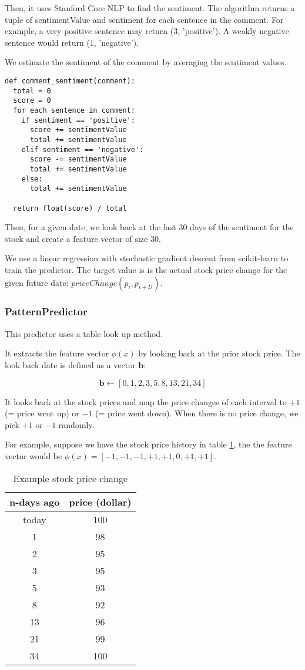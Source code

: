\documentclass[twocolumn,10pt]{asme2ej}
\newcommand{\vect}[1]{\boldsymbol{#1}}
\begin{document}
Then, it uses Stanford Core NLP \cite{manning-EtAl:2014:P14-5} to find
the sentiment. The algorithm returns a tuple of sentimentValue and
sentiment for each sentence in the comment. For example, a very
positive sentence may return (3, 'positive'). A weakly negative
sentence would return (1, 'negative').

We estimate the sentiment of the comment by averaging the sentiment
values.

\begin{verbatim}
def comment_sentiment(comment):
  total = 0
  score = 0
  for each sentence in comment:
    if sentiment == 'positive':
      score += sentimentValue
      total += sentimentValue
    elif sentiment == 'negative':
      score -= sentimentValue
      total += sentimentValue
    else:
      total += sentimentValue

  return float(score) / total
\end{verbatim}

Then, for a given date, we look back at the last 30 days of the sentiment
for the stock and create a feature vector of size 30.

We use a linear regression with stochastic gradient descent from
scikit-learn \cite{web:scikit_learn} to train the predictor. The
target value is is the actual stock price change for the given future
date: $priceChange(p_i, p_{i+D})$.

\subsubsection{PatternPredictor}

This predictor uses a table look up method.

It extracts the feature vector $\phi(x)$ by looking back at the prior
stock price. The look back date is defined as a vector $\vect{b}$:

\[
\vect{b} \gets [0, 1, 2, 3, 5, 8, 13, 21, 34]
\]

It looks back at the stock prices and map the price changes of each
interval to $+1$ (= price went up) or $-1$ (= price went down). When
there is no price change, we pick $+1$ or $-1$ randomly.

For example, suppose we have the stock price history in table
\ref{patternStockExample}, the the feature vector would be
$\phi(x)=[-1,-1,-1,+1,+1,0,+1,+1]$.

\begin{table}
  \begin{tabular}{cc}
    n-days ago & price (dollar) \\
    \hline
    today & 100 \\
    1 & 98 \\
    2 & 95 \\
    3 & 95 \\
    5 & 93 \\
    8 & 92 \\
    13 & 96 \\
    21 & 99 \\
    34 & 100 \\
  \end{tabular}
  \caption{Example stock price change}
  \label{patternStockExample}
\end{table}
\end{document}
